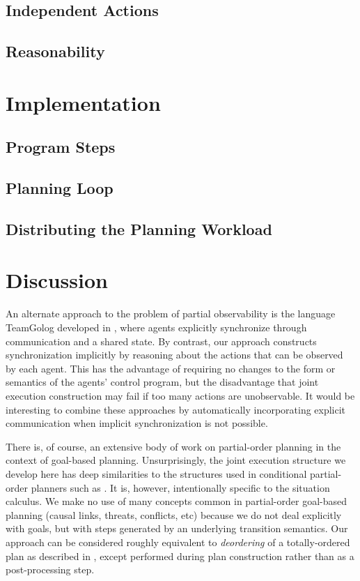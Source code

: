 \subsection{Independent Actions\label{sec:JointExec:IndepActs}}


\subsection{Reasonability}


\section{Implementation\label{sec:JointExec:Implementation}}


\subsection{Program Steps}


\subsection{Planning Loop}


\subsection{Distributing the Planning Workload}


\section{Discussion\label{sec:JointExec:Discussion}}

An alternate approach to the problem of partial observability is the
language TeamGolog developed in \citep{farinelli07team_golog}, where
agents explicitly synchronize through communication and a shared state.
By contrast, our approach constructs synchronization implicitly by
reasoning about the actions that can be observed by each agent. This
has the advantage of requiring no changes to the form or semantics
of the agents' control program, but the disadvantage that joint execution
construction may fail if too many actions are unobservable. It would
be interesting to combine these approaches by automatically incorporating
explicit communication when implicit synchronization is not possible.

There is, of course, an extensive body of work on partial-order planning
in the context of goal-based planning. Unsurprisingly, the joint execution
structure we develop here has deep similarities to the structures
used in conditional partial-order planners such as \citep{peot92conditional_nonlinear}.
It is, however, intentionally specific to the situation calculus.
We make no use of many concepts common in partial-order goal-based
planning (causal links, threats, conflicts, etc) because we do not
deal explicitly with goals, but with steps generated by an underlying
transition semantics. Our approach can be considered roughly equivalent
to \emph{deordering} of a totally-ordered plan as described in \citep{backstrom99reordering},
except performed during plan construction rather than as a post-processing
step.

